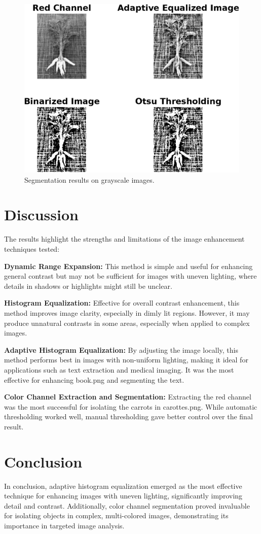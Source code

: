 \documentclass[a4paper,12pt]{article}
\begin{document}
\begin{multicols}{2}
\begin{figure}[H]
    \centering
    \includegraphics[width=0.50\linewidth]{Images/Figure 12.png} 
    \caption{Segmentation results on grayscale images.}
    \label{fig:dynamic_range_expansion}
\end{figure}

\section{Discussion}
The results highlight the strengths and limitations of the image enhancement techniques tested:

\textbf{Dynamic Range Expansion:} This method is simple and useful for enhancing general contrast but may not be sufficient for images with uneven lighting, where details in shadows or highlights might still be unclear.

\textbf{Histogram Equalization:} Effective for overall contrast enhancement, this method improves image clarity, especially in dimly lit regions. However, it may produce unnatural contrasts in some areas, especially when applied to complex images.

\textbf{Adaptive Histogram Equalization:} By adjusting the image locally, this method performs best in images with non-uniform lighting, making it ideal for applications such as text extraction and medical imaging. It was the most effective for enhancing book.png and segmenting the text.

\textbf{Color Channel Extraction and Segmentation:} Extracting the red channel was the most successful for isolating the carrots in carottes.png. While automatic thresholding worked well, manual thresholding gave better control over the final result.

\section{Conclusion}
In conclusion, adaptive histogram equalization emerged as the most effective technique for enhancing images with uneven lighting, significantly improving detail and contrast. Additionally, color channel segmentation proved invaluable for isolating objects in complex, multi-colored images, demonstrating its importance in targeted image analysis.


\end{multicols}
\end{document}
